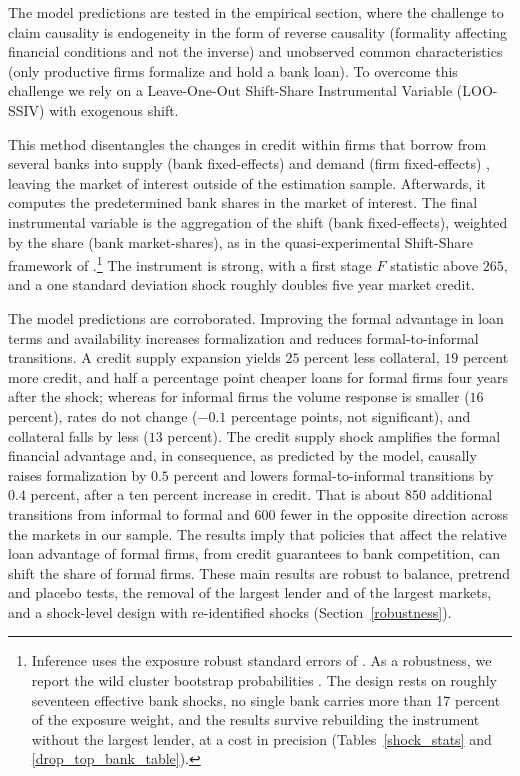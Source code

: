 \documentclass[12pt]{article}
\begin{document}
The model predictions are tested in the empirical section, where the challenge to claim causality is endogeneity in the form of reverse causality (formality affecting financial conditions and not the inverse) and unobserved common characteristics (only productive firms formalize and hold a bank loan). To overcome this challenge we rely on a Leave-One-Out Shift-Share Instrumental Variable (LOO-SSIV) with exogenous shift. 

This method disentangles the changes in credit within firms that borrow from several banks into supply (bank fixed-effects) and demand (firm fixed-effects) \citep{khwaja2008tracing, amiti2018much}, leaving the market of interest outside of the estimation sample. Afterwards, it computes the predetermined bank shares in the market of interest. The final instrumental variable is the aggregation of the shift (bank fixed-effects), weighted by the share (bank market-shares), as in the quasi-experimental Shift-Share framework of \citet{borusyak2022quasi}.\footnote{Inference uses the exposure robust standard errors of \citet{adao2019shiftshare}. As a robustness, we report the wild cluster bootstrap probabilities \citep{cameron2008bootstrap}. The design rests on roughly seventeen effective bank shocks, no single bank carries more than 17 percent of the exposure weight, and the results survive rebuilding the instrument without the largest lender, at a cost in precision (Tables~\ref{shock_stats} and \ref{drop_top_bank_table}).} The instrument is strong, with a first stage $F$ statistic above $265$, and a one standard deviation shock roughly doubles five year market credit.

The model predictions are corroborated. Improving the formal advantage in loan terms and availability increases formalization and reduces formal-to-informal transitions. A credit supply expansion yields $25$ percent less collateral, $19$ percent more credit, and half a percentage point cheaper loans for formal firms four years after the shock; whereas for informal firms the volume response is smaller ($16$ percent), rates do not change ($-0.1$ percentage points, not significant), and collateral falls by less ($13$ percent). The credit supply shock amplifies the formal financial advantage and, in consequence, as predicted by the model, causally raises formalization by $0.5$ percent and lowers formal-to-informal transitions by $0.4$ percent, after a ten percent increase in credit. That is about  $850$ additional transitions from informal to formal and $600$ fewer in the opposite direction across the markets in our sample. The results imply that policies that affect the relative loan advantage of formal firms, from credit guarantees to bank competition, can shift the share of formal firms. These main results are robust to balance, pretrend and placebo tests, the removal of the largest lender and of the largest markets, and a shock-level design with re-identified shocks (Section~\ref{robustness}).
\end{document}
